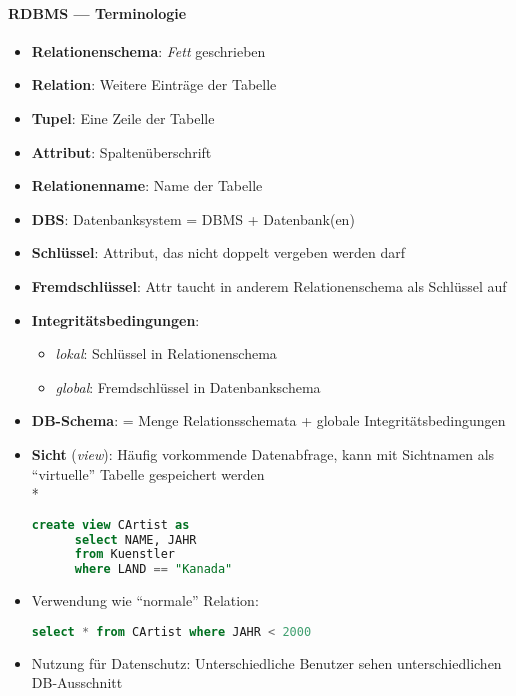 \paragraph{RDBMS --- Terminologie}
\begin{itemize}
  \item \textbf{Relationenschema}: \emph{Fett} geschrieben
  \item \textbf{Relation}: Weitere Einträge der Tabelle
  \item \textbf{Tupel}: Eine Zeile der Tabelle
  \item \textbf{Attribut}: Spaltenüberschrift
  \item \textbf{Relationenname}: Name der Tabelle
  \item \textbf{DBS}: Datenbanksystem = DBMS + Datenbank(en)
  \item \textbf{Schlüssel}: Attribut, das nicht doppelt vergeben werden darf
  \item \textbf{Fremdschlüssel}: Attr taucht in anderem Relationenschema als Schlüssel auf
  \item \textbf{Integritätsbedingungen}:
  \begin{itemize}
    \item \emph{lokal}: Schlüssel in Relationenschema
    \item \emph{global}: Fremdschlüssel in Datenbankschema
  \end{itemize}
  \item \textbf{DB-Schema}: = Menge Relationsschemata + globale Integritätsbedingungen
  \item \textbf{Sicht} (\emph{view}): Häufig vorkommende Datenabfrage, kann mit Sichtnamen als "`virtuelle"' Tabelle gespeichert werden \\*
  \begin{lstlisting}[language=sql]
    create view CArtist as
      select NAME, JAHR
      from Kuenstler
      where LAND == "Kanada"
  \end{lstlisting}
  \item Verwendung wie "`normale"' Relation:
  \begin{lstlisting}[language=sql]
    select * from CArtist where JAHR < 2000
  \end{lstlisting}
  \item Nutzung für Datenschutz: Unterschiedliche Benutzer sehen unterschiedlichen DB-Ausschnitt
\end{itemize}

